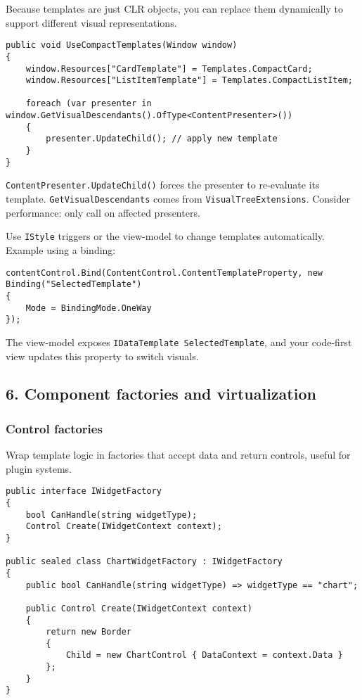 Because templates are just CLR objects, you can replace them dynamically
to support different visual representations.

\begin{lstlisting}
public void UseCompactTemplates(Window window)
{
    window.Resources["CardTemplate"] = Templates.CompactCard;
    window.Resources["ListItemTemplate"] = Templates.CompactListItem;

    foreach (var presenter in window.GetVisualDescendants().OfType<ContentPresenter>())
    {
        presenter.UpdateChild(); // apply new template
    }
}
\end{lstlisting}

\passthrough{\lstinline!ContentPresenter.UpdateChild()!} forces the
presenter to re-evaluate its template.
\passthrough{\lstinline!GetVisualDescendants!} comes from
\passthrough{\lstinline!VisualTreeExtensions!}. Consider performance:
only call on affected presenters.

Use \passthrough{\lstinline!IStyle!} triggers or the view-model to
change templates automatically. Example using a binding:

\begin{lstlisting}
contentControl.Bind(ContentControl.ContentTemplateProperty, new Binding("SelectedTemplate")
{
    Mode = BindingMode.OneWay
});
\end{lstlisting}

The view-model exposes
\passthrough{\lstinline!IDataTemplate SelectedTemplate!}, and your
code-first view updates this property to switch visuals.

\subsection{6. Component factories and
virtualization}\label{component-factories-and-virtualization}

\subsubsection{Control factories}\label{control-factories}

Wrap template logic in factories that accept data and return controls,
useful for plugin systems.

\begin{lstlisting}
public interface IWidgetFactory
{
    bool CanHandle(string widgetType);
    Control Create(IWidgetContext context);
}

public sealed class ChartWidgetFactory : IWidgetFactory
{
    public bool CanHandle(string widgetType) => widgetType == "chart";

    public Control Create(IWidgetContext context)
    {
        return new Border
        {
            Child = new ChartControl { DataContext = context.Data }
        };
    }
}
\end{lstlisting}

